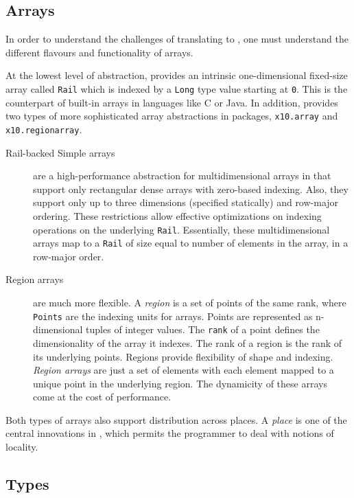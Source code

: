 \subsection{Arrays}\label{subsec:ArrayDesc}

In order to understand the challenges of translating \matlab to \xten,
one must understand the different flavours and functionality of \xten
arrays.

At the lowest level of abstraction, \xten provides an intrinsic
one-dimensional fixed-size array  called \verb|Rail| which is indexed by
a \verb|Long| type value starting at \verb|0|.  This is the \xten
counterpart of built-in arrays in languages like C or Java.  In
addition, \xten provides two types of more sophisticated array
abstractions in packages, \verb|x10.array| and \verb|x10.regionarray|.

\begin{description}
\item[Rail-backed Simple arrays] are a high-performance abstraction for
multidimensional arrays in \xten that support only rectangular dense
arrays with zero-based indexing. Also, they support only up to three
dimensions (specified statically) and row-major ordering. These
restrictions allow effective optimizations on indexing operations on the
underlying \verb|Rail|.  Essentially, these multidimensional arrays map
to a \verb|Rail| of size equal to number of elements in the array, in a
row-major order.

\item[Region arrays] are much more flexible.  A \emph{region} is a
set of points of the same rank, where \texttt{Points} are the indexing
units for arrays. Points are represented as n-dimensional tuples of
integer values. The \verb|rank| of a point defines the dimensionality of
the array it indexes.  The rank of a region is the rank of its
underlying points.  Regions provide flexibility of shape and indexing.
\emph{Region arrays} are just a set of elements with each element mapped
to a unique point in the underlying region. The dynamicity of these
arrays come at the cost of performance.

\end{description}
Both types of arrays also support distribution across places.  A
\emph{place} is one of the central innovations in \xten, which permits
the programmer to deal with notions of locality.


\subsection{Types}

